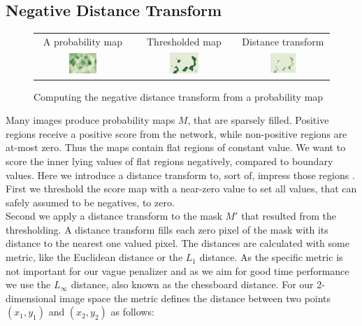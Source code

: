 \subsection{Negative Distance Transform}
\label{sec:pipeline:eval:dt}
\begin{figure}[htb]
    \begin{tabular}{ccc}
        A probability map & Thresholded map & Distance transform \\[3pt]
        \includegraphics[width=0.303\textwidth]{figures/distance_transform_hm} &
        \includegraphics[width=0.303\textwidth]{figures/distance_transform_thres} &
        \includegraphics[width=0.303\textwidth]{figures/distance_transform_negative}
    \end{tabular}
	\caption{Computing the negative distance transform from a probability map}
    \label{fig:distance_transform}
\end{figure}
Many images produce probability maps $M$, that are sparsely filled. Positive regions receive a positive score from the network, while non-positive regions are at-most zero. Thus the maps contain flat regions of constant value. We want to score the inner lying values of flat regions negatively, compared to boundary values. Here we introduce a distance transform to, sort of, impress those regions .\\
First we threshold the score map with a near-zero value to set all values, that can safely assumed to be negatives, to zero.\\
Second we apply a distance transform to the mask $M'$ that resulted from the thresholding. A distance transform fills each zero pixel of the mask with its distance to the nearest one valued pixel. The distances are calculated with some metric, like the Euclidean distance or the $L_1$ distance. As the specific metric is not important for our vague penalizer and as we aim for good time performance we use the $L_\infty$ distance, also known as the chessboard distance. For our 2-dimensional image space the metric defines the distance between two points $(x_1, y_1)$ and $(x_2, y_2)$ as follows:
